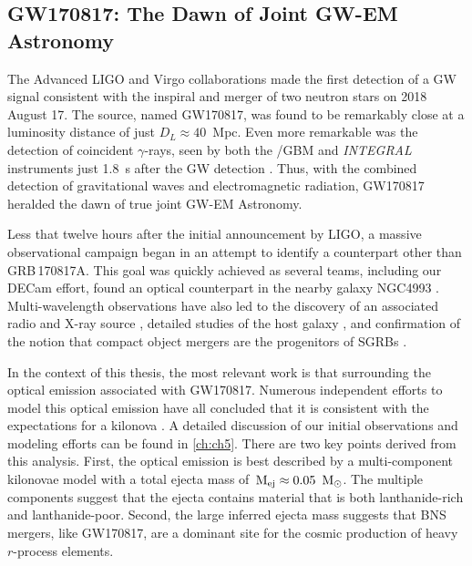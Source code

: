 \subsection{GW170817: The Dawn of Joint GW-EM Astronomy}
\label{sec:intro_gw170817}
The Advanced LIGO and Virgo collaborations made the first detection of a GW signal consistent with the inspiral and merger of two neutron stars \citep{LIGOGW170817} on 2018 August 17. The source, named GW170817, was found to be remarkably close at a luminosity distance of just $D_L \approx 40$~Mpc. Even more remarkable was the detection of coincident $\gamma$-rays, seen by both the \fermi/GBM and {\it INTEGRAL} instruments just 1.8~s after the GW detection \citep[GRB\,170817A;][]{LIGOGW170817grb,GW170817Fermi,Savchenko+17}. Thus, with the combined detection of gravitational waves and electromagnetic radiation, GW170817 heralded the dawn of true joint GW-EM Astronomy.

Less that twelve hours after the initial announcement by LIGO, a massive observational campaign began in an attempt to identify a counterpart other than GRB\,170817A. This goal was quickly achieved as several teams, including our DECam effort, found an optical counterpart in the nearby galaxy NGC4993 \citep{LIGOMMAPaper,Arcavi+17,Coulter+17,GW170817DECam,Valenti+17}. Multi-wavelength observations have also led to the discovery of an associated radio and X-ray source \citep{Alexander+17,Davanzo+18,Margutti+17,Margutti+18,Mooley+18,Troja+17}, detailed studies of the host galaxy \citep{Blanchard+17,Cantiello+18}, and confirmation of the notion that compact object mergers are the progenitors of SGRBs \citep{Fong+17}.

In the context of this thesis, the most relevant work is that surrounding the optical emission associated with GW170817. Numerous independent efforts to model this optical emission have all concluded that it is consistent with the expectations for a kilonova \citep{Cowp+17,Kilpatrick+17,Tanaka+17,Villar+17b, Tanaka+18}. A detailed discussion of our initial observations and modeling efforts can be found in \cref{ch:ch5}. There are two key points derived from this analysis. First, the optical emission is best described by a multi-component kilonovae model with a total ejecta mass of $\rm\,M_{\rm ej} \approx 0.05~{\rm\,M_\odot}$. The multiple components suggest that the ejecta contains material that is both lanthanide-rich and lanthanide-poor. Second, the large inferred ejecta mass suggests that BNS mergers, like GW170817, are a dominant site for the cosmic production of heavy $r$-process elements.

